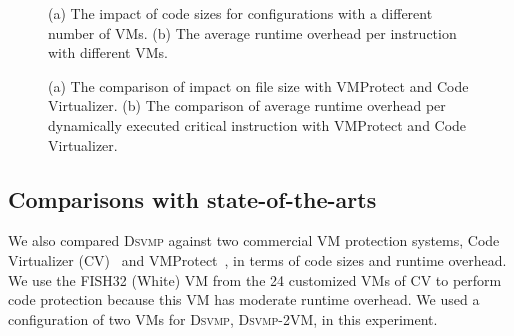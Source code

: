 \documentclass[conference]{IEEEtran}
\newcommand{\DSVMP}{\textsc{Dsvmp}\xspace}
\begin{document}
\begin{figure}[t]
\centering
{}
\caption{(a) The impact of code sizes for configurations with a different number of VMs. (b) The average runtime overhead per instruction with different VMs.}\label{fig:Fig.6}
\centering
{}
\caption{(a) The comparison of impact on file size with VMProtect and Code Virtualizer. (b) The comparison of average runtime overhead per dynamically executed critical instruction with VMProtect and Code Virtualizer.}\label{fig:Fig.7}
\vspace{-4mm}
\end{figure}

\subsection{Comparisons with state-of-the-arts}
We also compared \DSVMP against two commercial VM protection systems, Code Virtualizer (CV)~\cite{2CV} and VMProtect~\cite{3Vmprotect}, in terms of code sizes and runtime overhead.
We use the FISH32 (White) VM from the 24 customized VMs of CV to perform code protection because this VM has moderate runtime overhead. We used a configuration of two VMs for \DSVMP, \DSVMP-2VM, in this experiment.
\end{document}
